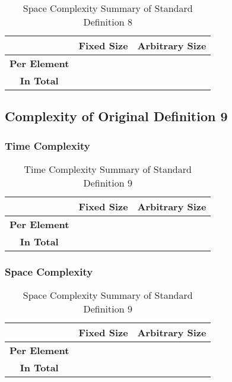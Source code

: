 \documentclass[conference]{IEEEtran}
\begin{document}
\begin{table}[H]
    \centering
    \caption{Space Complexity Summary of Standard Definition 8}
    \begin{tabular}{|c|c|c|}
        \hline
        & \textbf{Fixed Size} & \textbf{Arbitrary Size} \\
        \hline
        \textbf{Per Element} &  &  \\
        \hline
        \textbf{In Total} &  &  \\
        \hline
    \end{tabular}
    \label{tab:space_p2_d08}
\end{table}

\subsection{Complexity of Original Definition 9}
\label{ca:p2_d09}

\subsubsection{Time Complexity}

\begin{table}[H]
    \centering
    \caption{Time Complexity Summary of Standard Definition 9}
    \begin{tabular}{|c|c|c|}
        \hline
        & \textbf{Fixed Size} & \textbf{Arbitrary Size} \\
        \hline
        \textbf{Per Element} &  &  \\
        \hline
        \textbf{In Total} &  &  \\
        \hline
    \end{tabular}
    \label{tab:time_p2_d09}
\end{table}

\subsubsection{Space Complexity}

\begin{table}[H]
    \centering
    \caption{Space Complexity Summary of Standard Definition 9}
    \begin{tabular}{|c|c|c|}
        \hline
        & \textbf{Fixed Size} & \textbf{Arbitrary Size} \\
        \hline
        \textbf{Per Element} &  &  \\
        \hline
        \textbf{In Total} &  &  \\
        \hline
    \end{tabular}
    \label{tab:space_p2_d09}
\end{table}
\end{document}
